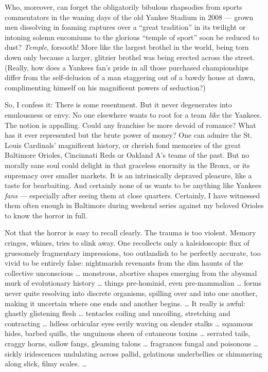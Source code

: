 Who, moreover, can forget the obligatorily bibulous rhapsodies from
sports commentators in the waning days of the old Yankee Stadium in 2008
--- grown men dissolving in foaming raptures over a ``great tradition''
in its twilight or intoning solemn encomiums to the glorious ``temple of
sport'' soon be reduced to dust? \emph{Temple}, forsooth! More like the
largest brothel in the world, being torn down only because a larger,
glitzier brothel was being erected across the street. (Really, how does
a Yankees fan's pride in all those purchased championships differ from
the self-delusion of a man staggering out of a bawdy house at dawn,
complimenting himself on his magnificent powers of seduction?)

So, I confess it: There is some resentment. But it never degenerates
into emulousness or envy. No one elsewhere wants to root for a team
\emph{like} the Yankees. The notion is appalling. Could any franchise be
more devoid of romance? What has it ever represented but the brute power
of money? One can admire the St. Louis Cardinals' magnificent history,
or cherish fond memories of the great Baltimore Orioles, Cincinnati Reds
or Oakland A's teams of the past. But no morally sane soul could delight
in that graceless enormity in the Bronx, or its supremacy over smaller
markets. It is an intrinsically depraved pleasure, like a taste for
bearbaiting. And certainly none of us wants to be anything like Yankees
\emph{fans} --- especially after seeing them at close quarters.
Certainly, I have witnessed them often enough in Baltimore during
weekend series against my beloved Orioles to know the horror in full.

Not that the horror is easy to recall clearly. The trauma is too
violent. Memory cringes, whines, tries to slink away. One recollects
only a kaleidoscopic flux of gruesomely fragmentary impressions, too
outlandish to be perfectly accurate, too vivid to be entirely false:
nightmarish revenants from the dim haunts of the collective unconscious
\ldots{} monstrous, abortive shapes emerging from the abysmal murk of
evolutionary history \ldots{} things pre-hominid, even pre-mammalian
\ldots{} forms never quite resolving into discrete organisms, spilling
over and into one another, making it uncertain where one ends and
another begins. \ldots{} It really is awful: ghastly glistening flesh
\ldots{} tentacles coiling and uncoiling, stretching and contracting
\ldots{} lidless orbicular eyes eerily waving on slender stalks \ldots{}
squamous hides, barbed quills, the unguinous sheen of cutaneous toxins
\ldots{} serrated tails, craggy horns, sallow fangs, gleaming talons
\ldots{} fragrances fungal and poisonous \ldots{} sickly iridescences
undulating across pallid, gelatinous underbellies or shimmering along
slick, filmy scales. \ldots{}

